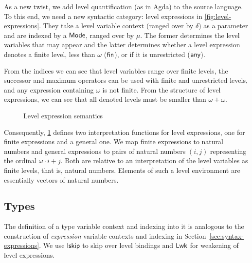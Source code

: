 \documentclass[manuscript,screen,review,anonymous]{acmart}
\begin{document}
As a new twist, we add level quantification (as in Agda) to the source
language. To this end, we need a new syntactic category: level
expressions in \cref{fig:level-expressions}. They take a level variable context {\IRLEnv} (ranged over
by $\delta$) as a parameter and are
indexed by a $\AMode$, ranged over by $\mu$. The former determines the
level variables that may appear and the latter determines whether a level
expression denotes a finite level, less than $\omega$ ($\Afin$), or if
it is unrestricted ($\Aany$).

From the indices we can see that level variables range over finite
levels, the successor and maximum operators can be used with finite
and unrestricted levels, and any expression containing $\omega$ is not
finite. From the structure of level expressions, we can see that all
denoted levels must be smaller than $\omega + \omega$. 

\begin{figure}[tp]
  \begin{minipage}{0.45\linewidth}
    \IRLSemFin
  \end{minipage}
  \begin{minipage}{0.45\linewidth}
    \IRLSemAny
  \end{minipage}
  \caption{Level expression semantics}
  \label{fig:ir-semantics-level-expressions}
\end{figure}
Consequently, \cref{fig:ir-semantics-level-expressions} defines two interpretation functions for level
expressions, one for finite expressions and a general one. We map
finite expressions to natural numbers and general expressions to pairs of natural numbers $(i, j)$
representing the ordinal $\omega\cdot i + j$. 
Both are relative to an interpretation  of the level variables as
finite levels, that is, natural numbers. Elements of such a level
environment are essentially vectors of natural numbers.

\IRLEnvSem

\subsection{Types}
\label{sec:types}

The definition of a type variable context and indexing into it is
analogous to the construction of \emph{expression} variable contexts
and indexing in Section~\ref{sec:syntax-expressions}.  We use $\Alskip$ to skip
over level bindings and $\ALwk$ for weakening of level expressions.
\end{document}
